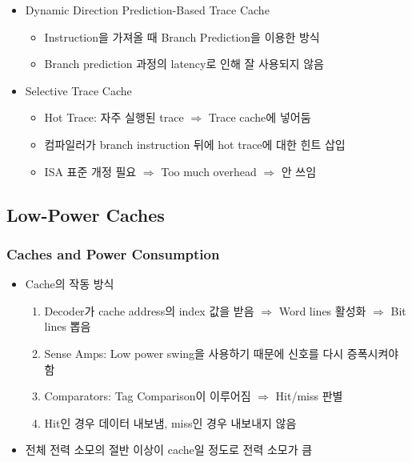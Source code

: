 \begin{itemize}
\begin{itemize}
    \end{itemize}
    \item Dynamic Direction Prediction-Based Trace Cache
    \begin{itemize}
        \item Instruction을 가져올 때 Branch Prediction을 이용한 방식
        \item Branch prediction 과정의 latency로 인해 잘 사용되지 않음
    \end{itemize}
    \item Selective Trace Cache
    \begin{itemize}
        \item Hot Trace: 자주 실행된 trace $\Rightarrow$ Trace cache에 넣어둠
        \item 컴파일러가 branch instruction 뒤에 hot trace에 대한 힌트 삽입
        \item ISA 표준 개정 필요 $\Rightarrow$ Too much overhead $\Rightarrow$ 안 쓰임
    \end{itemize}
\end{itemize}

\subsection{Low-Power Caches}

\subsubsection*{Caches and Power Consumption}
\begin{figures}
\end{figures}
\begin{itemize}
    \item Cache의 작동 방식
    \begin{enumerate}
        \item Decoder가 cache address의 index 값을 받음 $\Rightarrow$ Word lines 활성화 $\Rightarrow$ Bit lines 뽑음
        \item Sense Amps: Low power swing을 사용하기 때문에 신호를 다시 증폭시켜야 함
        \item Comparators: Tag Comparison이 이루어짐 $\Rightarrow$ Hit/miss 판별
        \item Hit인 경우 데이터 내보냄, miss인 경우 내보내지 않음
    \end{enumerate}
    \item 전체 전력 소모의 절반 이상이 cache일 정도로 전력 소모가 큼
\end{itemize}

